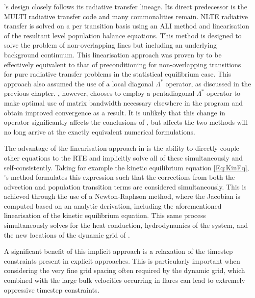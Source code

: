 \Radyn{}'s design closely follows its radiative transfer lineage. Its direct predecessor is the MULTI radiative transfer code and many commonalities remain.
NLTE radiative transfer is solved on a per transition basis using an ALI method and linearisation of the resultant level population balance equations.
This method is designed to solve the problem of non-overlapping lines but including an underlying background continuum.
This linearisation approach was proven by \citet{SocasNavarro1997} to be effectively equivalent to that of preconditioning for non-overlapping transitions \citep{Rybicki1991} for pure radiative transfer problems in the statistical equilibrium case.
This approach also assumed the use of a local diagonal $\Lambda^*$ operator, as discussed in the previous chapter.
\Radyn{}, however, chooses to employ a pentadiagonal $\Lambda^*$ operator to make optimal use of matrix bandwidth necessary elsewhere in the program and obtain improved convergence as a result.
It is unlikely that this change in operator significantly affects the conclusions of \citet{SocasNavarro1997}, but affects the two methods will no long arrive at the exactly equivalent numerical formulations.

The advantage of the linearisation approach in \Radyn{} is the ability to directly couple other equations to the RTE and implicitly solve all of these simultaneously and self-consistently.
Taking for example the kinetic equilibrium equation \eqref{Eq:KinEq}, \Radyn{}'s method formulates this expression such that the corrections from both the advection and population transition terms are considered simultaneously.
This is achieved through the use of a Newton-Raphson method, where the Jacobian is computed based on an analytic derivation, including the aforementioned linearisation of the kinetic equilibrium equation.
This same process simultaneously solves for the heat conduction, hydrodynamics of the system, and the new locations of the dynamic grid of \citet{Dorfi1987}.

A significant benefit of this implicit approach is a relaxation of the timestep constraints present in explicit approaches.
This is particularly important when considering the very fine grid spacing often required by the dynamic grid, which combined with the large bulk velocities occurring in flares can lead to extremely oppressive timestep constraints.


